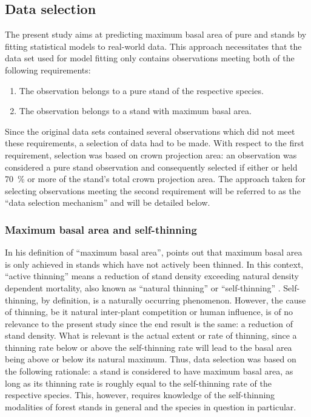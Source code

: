 \subsection{Data selection}
The present study aims at predicting maximum basal area of pure \Beech{} and \Spruce{} stands by fitting statistical models to real-world data.  This approach necessitates that the data set used for model fitting only contains observations meeting both of the following requirements:
\begin{enumerate}
\item The observation belongs to a pure stand of the respective species.
\item The observation belongs to a stand with maximum basal area.
\end{enumerate}
Since the original data sets contained several observations which did not meet these requirements, a selection of data had to be made.  With respect to the first requirement, selection was based on crown projection area: an observation was considered a pure stand observation and consequently selected if either \Beech{} or \Spruce{} held \SI{70}{\percent} or more of the stand’s total crown projection area.
The approach taken for selecting observations meeting the second requirement will be referred to as the ``data selection mechanism'' and will be detailed below.

\subsubsection{Maximum basal area and self-thinning}

In his definition of ``maximum basal area'', \textcite{Assmann1970} points out that maximum basal area is only achieved in stands which have not actively been thinned.  In this context, ``active thinning'' means a reduction of stand density exceeding natural density dependent mortality, also known as ``natural thinning'' \parencite{SAF1958} or ``self-thinning'' \parencite{Roehrig1992}.  Self-thinning, by definition, is a naturally occurring phenomenon.  However, the cause of thinning, be it natural inter-plant competition or human influence, is of no relevance to the present study since the end result is the same: a reduction of stand density.  What is relevant is the actual extent or rate of thinning, since a thinning rate below or above the self-thinning rate will lead to the basal area being above or below its natural maximum.  Thus, data selection was based on the following rationale: a stand is considered to have maximum basal area, as long as its thinning rate is roughly equal to the self-thinning rate of the respective species.  This, however, requires knowledge of the self-thinning modalities of forest stands in general and the species in question in particular.

